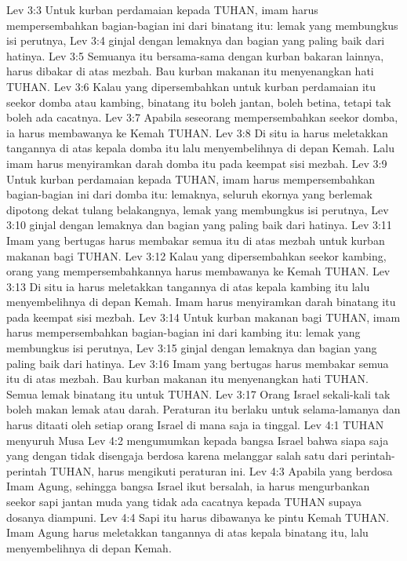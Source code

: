 Lev 3:3  Untuk kurban perdamaian kepada TUHAN, imam harus mempersembahkan bagian-bagian ini dari binatang itu: lemak yang membungkus isi perutnya,
Lev 3:4  ginjal dengan lemaknya dan bagian yang paling baik dari hatinya.
Lev 3:5  Semuanya itu bersama-sama dengan kurban bakaran lainnya, harus dibakar di atas mezbah. Bau kurban makanan itu menyenangkan hati TUHAN.
Lev 3:6  Kalau yang dipersembahkan untuk kurban perdamaian itu seekor domba atau kambing, binatang itu boleh jantan, boleh betina, tetapi tak boleh ada cacatnya.
Lev 3:7  Apabila seseorang mempersembahkan seekor domba, ia harus membawanya ke Kemah TUHAN.
Lev 3:8  Di situ ia harus meletakkan tangannya di atas kepala domba itu lalu menyembelihnya di depan Kemah. Lalu imam harus menyiramkan darah domba itu pada keempat sisi mezbah.
Lev 3:9  Untuk kurban perdamaian kepada TUHAN, imam harus mempersembahkan bagian-bagian ini dari domba itu: lemaknya, seluruh ekornya yang berlemak dipotong dekat tulang belakangnya, lemak yang membungkus isi perutnya,
Lev 3:10  ginjal dengan lemaknya dan bagian yang paling baik dari hatinya.
Lev 3:11  Imam yang bertugas harus membakar semua itu di atas mezbah untuk kurban makanan bagi TUHAN.
Lev 3:12  Kalau yang dipersembahkan seekor kambing, orang yang mempersembahkannya harus membawanya ke Kemah TUHAN.
Lev 3:13  Di situ ia harus meletakkan tangannya di atas kepala kambing itu lalu menyembelihnya di depan Kemah. Imam harus menyiramkan darah binatang itu pada keempat sisi mezbah.
Lev 3:14  Untuk kurban makanan bagi TUHAN, imam harus mempersembahkan bagian-bagian ini dari kambing itu: lemak yang membungkus isi perutnya,
Lev 3:15  ginjal dengan lemaknya dan bagian yang paling baik dari hatinya.
Lev 3:16  Imam yang bertugas harus membakar semua itu di atas mezbah. Bau kurban makanan itu menyenangkan hati TUHAN. Semua lemak binatang itu untuk TUHAN.
Lev 3:17  Orang Israel sekali-kali tak boleh makan lemak atau darah. Peraturan itu berlaku untuk selama-lamanya dan harus ditaati oleh setiap orang Israel di mana saja ia tinggal.
Lev 4:1  TUHAN menyuruh Musa
Lev 4:2  mengumumkan kepada bangsa Israel bahwa siapa saja yang dengan tidak disengaja berdosa karena melanggar salah satu dari perintah-perintah TUHAN, harus mengikuti peraturan ini.
Lev 4:3  Apabila yang berdosa Imam Agung, sehingga bangsa Israel ikut bersalah, ia harus mengurbankan seekor sapi jantan muda yang tidak ada cacatnya kepada TUHAN supaya dosanya diampuni.
Lev 4:4  Sapi itu harus dibawanya ke pintu Kemah TUHAN. Imam Agung harus meletakkan tangannya di atas kepala binatang itu, lalu menyembelihnya di depan Kemah.
